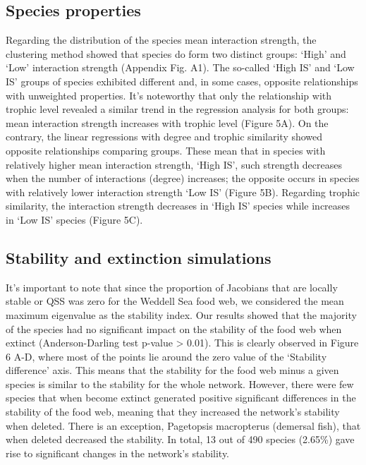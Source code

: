 \documentclass[gc, manuscript]{copernicus}
\begin{document}
\subsection{Species properties}

Regarding the distribution of the species mean interaction strength, the
clustering method showed that species do form two distinct groups:
`High' and `Low' interaction strength (Appendix Fig. A1). The so-called
`High IS' and `Low IS' groups of species exhibited different and, in
some cases, opposite relationships with unweighted properties. It's
noteworthy that only the relationship with trophic level revealed a
similar trend in the regression analysis for both groups: mean
interaction strength increases with trophic level (Figure 5A). On the
contrary, the linear regressions with degree and trophic similarity
showed opposite relationships comparing groups. These mean that in
species with relatively higher mean interaction strength, `High IS',
such strength decreases when the number of interactions (degree)
increases; the opposite occurs in species with relatively lower
interaction strength `Low IS' (Figure 5B). Regarding trophic similarity,
the interaction strength decreases in `High IS' species while increases
in `Low IS' species (Figure 5C).

\subsection{Stability and extinction simulations}

It's important to note that since the proportion of Jacobians that are
locally stable or QSS was zero for the Weddell Sea food web, we
considered the mean maximum eigenvalue as the stability index. Our
results showed that the majority of the species had no significant
impact on the stability of the food web when extinct (Anderson-Darling
test p-value \textgreater{} 0.01). This is clearly observed in Figure 6
A-D, where most of the points lie around the zero value of the
`Stability difference' axis. This means that the stability for the food
web minus a given species is similar to the stability for the whole
network. However, there were few species that when become extinct
generated positive significant differences in the stability of the food
web, meaning that they increased the network's stability when deleted.
There is an exception, Pagetopsis macropterus (demersal fish), that when
deleted decreased the stability. In total, 13 out of 490 species
(2.65\%) gave rise to significant changes in the network's stability.
\end{document}
